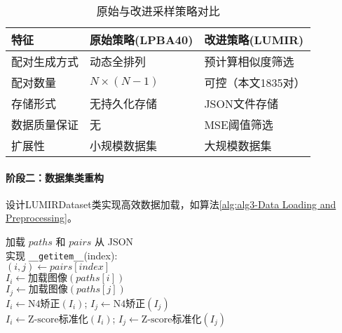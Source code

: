 \begin{table}[!h]
    \centering
    \caption{原始与改进采样策略对比}
    \label{tab1}
    \begin{tabular}{lll}
        \toprule
        \textbf{特征} & \textbf{原始策略(LPBA40)} & \textbf{改进策略(LUMIR)} \\
        \midrule
        配对生成方式      & 动态全排列                 & 预计算相似度筛选             \\
        配对数量        & $N \times (N-1)$      & 可控（本文1835对）          \\
        存储形式        & 无持久化存储                & JSON文件存储             \\
        数据质量保证      & 无                     & MSE阈值筛选              \\
        扩展性         & 小规模数据集                & 大规模数据集               \\
        \bottomrule
    \end{tabular}
\end{table}



\paragraph{阶段二：数据集类重构}
设计LUMIRDataset类实现高效数据加载，如算法\ref{alg:alg3-Data Loading and Preprocessing}。

\begin{algorithm}

    \label{alg:alg3-Data Loading and Preprocessing}

    加载 $paths$ 和 $pairs$ 从 JSON \\
    实现 \texttt{\_\_getitem\_\_}(index): \\
    \Indp
    $(i,j) \gets pairs[index]$ \\
    $I_i \gets \text{加载图像}(paths[i])$ \\
    $I_j \gets \text{加载图像}(paths[j])$ \\
    $I_i \gets \text{N4矫正}(I_i)$; $I_j \gets \text{N4矫正}(I_j)$ \\
    $I_i \gets \text{Z-score标准化}(I_i)$; $I_j \gets \text{Z-score标准化}(I_j)$ \\
    
\end{algorithm}

